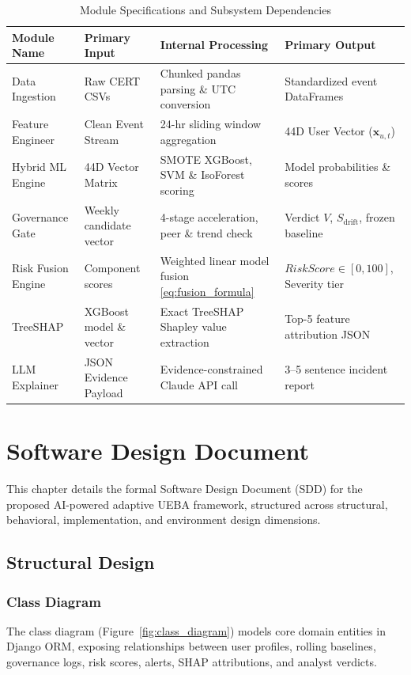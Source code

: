 \documentclass[12pt,a4paper]{report}
\begin{document}
\begin{table}[htbp]
\caption{Module Specifications and Subsystem Dependencies}
\label{tab:module_descriptions}
\centering
\small
\begin{tabularx}{\textwidth}{l X X X}
\toprule
\textbf{Module Name} & \textbf{Primary Input} & \textbf{Internal Processing} & \textbf{Primary Output} \\
\midrule
Data Ingestion & Raw CERT CSVs & Chunked pandas parsing \& UTC conversion & Standardized event DataFrames \\
Feature Engineer & Clean Event Stream & 24-hr sliding window aggregation & 44D User Vector ($\mathbf{x}_{u,t}$) \\
Hybrid ML Engine & 44D Vector Matrix & SMOTE XGBoost, SVM \& IsoForest scoring & Model probabilities \& scores \\
Governance Gate & Weekly candidate vector & 4-stage acceleration, peer \& trend check & Verdict $V$, $S_{\text{drift}}$, frozen baseline \\
Risk Fusion Engine & Component scores & Weighted linear model fusion \eqref{eq:fusion_formula} & $RiskScore \in [0,100]$, Severity tier \\
TreeSHAP & XGBoost model \& vector & Exact TreeSHAP Shapley value extraction & Top-5 feature attribution JSON \\
LLM Explainer & JSON Evidence Payload & Evidence-constrained Claude API call & 3--5 sentence incident report \\
\bottomrule
\end{tabularx}
\end{table}

\chapter{Software Design Document}
\label{chap:software_design}

This chapter details the formal Software Design Document (SDD) for the proposed AI-powered adaptive UEBA framework, structured across structural, behavioral, implementation, and environment design dimensions.

\section{Structural Design}

\subsection{Class Diagram}
The class diagram (Figure~\ref{fig:class_diagram}) models core domain entities in Django ORM, exposing relationships between user profiles, rolling baselines, governance logs, risk scores, alerts, SHAP attributions, and analyst verdicts.
\end{document}
